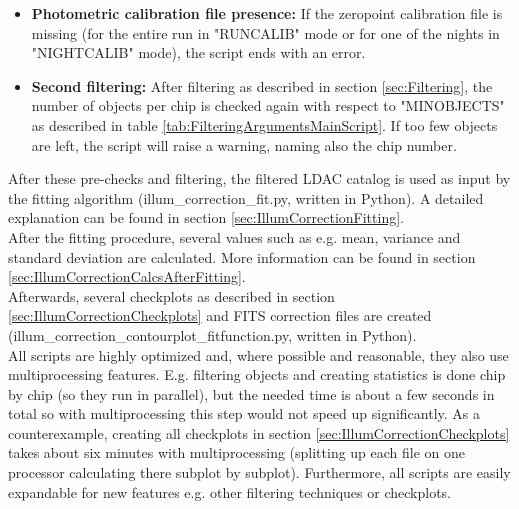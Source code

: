 \begin{itemize}
\item \textbf{Photometric calibration file presence:} If the zeropoint calibration file is missing (for the entire run in "RUNCALIB" mode or for one of the nights in "NIGHTCALIB" mode), the script ends with an error.
\item \textbf{Second filtering:} After filtering as described in section \ref{sec:Filtering}, the number of objects per chip is checked again with respect to "MINOBJECTS" as described in table \ref{tab:FilteringArgumentsMainScript}. If too few objects are left, the script will raise a warning, naming also the chip number.
\end{itemize}

After these pre-checks and filtering, the filtered LDAC catalog is used as input by the fitting algorithm (illum\_correction\_fit.py, written in Python). A detailed explanation can be found in section \ref{sec:IllumCorrectionFitting}.\\

After the fitting procedure, several values such as e.g. mean, variance and standard deviation are calculated. More information can be found in section \ref{sec:IllumCorrectionCalcsAfterFitting}.\\

Afterwards, several checkplots as described in section \ref{sec:IllumCorrectionCheckplots} and FITS correction files are created (illum\_correction\_contourplot\_fitfunction.py, written in Python).\\

All scripts are highly optimized and, where possible and reasonable, they also use multiprocessing features. E.g. filtering objects and creating statistics is done chip by chip (so they run in parallel), but the needed time is about a few seconds in total so with multiprocessing this step would not speed up significantly. As a counterexample, creating all checkplots in section \ref{sec:IllumCorrectionCheckplots} takes about six minutes with multiprocessing (splitting up each file on one processor calculating there subplot by subplot). Furthermore, all scripts are easily expandable for new features e.g. other filtering techniques or checkplots.


